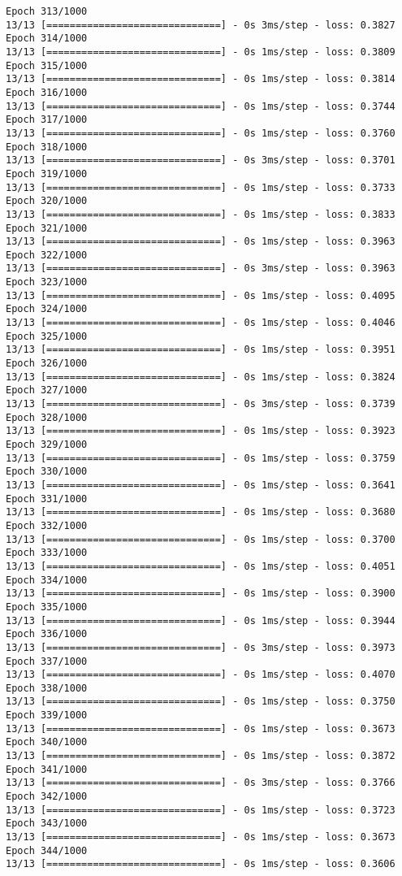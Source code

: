 \documentclass[11pt]{article}
\begin{document}
\begin{Verbatim}[commandchars=\\\{\}]
Epoch 313/1000
13/13 [==============================] - 0s 3ms/step - loss: 0.3827
Epoch 314/1000
13/13 [==============================] - 0s 1ms/step - loss: 0.3809
Epoch 315/1000
13/13 [==============================] - 0s 1ms/step - loss: 0.3814
Epoch 316/1000
13/13 [==============================] - 0s 1ms/step - loss: 0.3744
Epoch 317/1000
13/13 [==============================] - 0s 1ms/step - loss: 0.3760
Epoch 318/1000
13/13 [==============================] - 0s 3ms/step - loss: 0.3701
Epoch 319/1000
13/13 [==============================] - 0s 1ms/step - loss: 0.3733
Epoch 320/1000
13/13 [==============================] - 0s 1ms/step - loss: 0.3833
Epoch 321/1000
13/13 [==============================] - 0s 1ms/step - loss: 0.3963
Epoch 322/1000
13/13 [==============================] - 0s 3ms/step - loss: 0.3963
Epoch 323/1000
13/13 [==============================] - 0s 1ms/step - loss: 0.4095
Epoch 324/1000
13/13 [==============================] - 0s 1ms/step - loss: 0.4046
Epoch 325/1000
13/13 [==============================] - 0s 1ms/step - loss: 0.3951
Epoch 326/1000
13/13 [==============================] - 0s 1ms/step - loss: 0.3824
Epoch 327/1000
13/13 [==============================] - 0s 3ms/step - loss: 0.3739
Epoch 328/1000
13/13 [==============================] - 0s 1ms/step - loss: 0.3923
Epoch 329/1000
13/13 [==============================] - 0s 1ms/step - loss: 0.3759
Epoch 330/1000
13/13 [==============================] - 0s 1ms/step - loss: 0.3641
Epoch 331/1000
13/13 [==============================] - 0s 1ms/step - loss: 0.3680
Epoch 332/1000
13/13 [==============================] - 0s 1ms/step - loss: 0.3700
Epoch 333/1000
13/13 [==============================] - 0s 1ms/step - loss: 0.4051
Epoch 334/1000
13/13 [==============================] - 0s 1ms/step - loss: 0.3900
Epoch 335/1000
13/13 [==============================] - 0s 1ms/step - loss: 0.3944
Epoch 336/1000
13/13 [==============================] - 0s 3ms/step - loss: 0.3973
Epoch 337/1000
13/13 [==============================] - 0s 1ms/step - loss: 0.4070
Epoch 338/1000
13/13 [==============================] - 0s 1ms/step - loss: 0.3750
Epoch 339/1000
13/13 [==============================] - 0s 1ms/step - loss: 0.3673
Epoch 340/1000
13/13 [==============================] - 0s 1ms/step - loss: 0.3872
Epoch 341/1000
13/13 [==============================] - 0s 3ms/step - loss: 0.3766
Epoch 342/1000
13/13 [==============================] - 0s 1ms/step - loss: 0.3723
Epoch 343/1000
13/13 [==============================] - 0s 1ms/step - loss: 0.3673
Epoch 344/1000
13/13 [==============================] - 0s 1ms/step - loss: 0.3606

\end{Verbatim}
\end{document}
